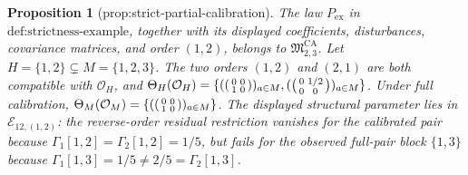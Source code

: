 \documentclass{article}
\newtheorem{proposition}{Proposition}
\begin{document}
\begin{proposition}[prop:strict-partial-calibration]\label{prop:strict-partial-calibration}
The law \(P_{\mathrm{ex}}\) in \(\text{def:strictness-example}\), together with its displayed coefficients, disturbances, covariance matrices, and order \((1,2)\), belongs to \(\mathfrak M_{2,3}^{\mathrm{CA}}\). Let \(H=\{1,2\}\subsetneq M=\{1,2,3\}\). The two orders \((1,2)\) and \((2,1)\) are both compatible with \(\mathcal O_H\), and \(\Theta_H(\mathcal O_H)=\{(\begin{psmallmatrix}0&0\\1&0\end{psmallmatrix})_{a\in M},(\begin{psmallmatrix}0&1/2\\0&0\end{psmallmatrix})_{a\in M}\}\). Under full calibration, \(\Theta_M(\mathcal O_M)=\{(\begin{psmallmatrix}0&0\\1&0\end{psmallmatrix})_{a\in M}\}\). The displayed structural parameter lies in \(\mathcal E_{12,(1,2)}\): the reverse-order residual restriction vanishes for the calibrated pair because \(\Gamma_1[1,2]=\Gamma_2[1,2]=1/5\), but fails for the observed full-pair block \(\{1,3\}\) because \(\Gamma_1[1,3]=1/5\ne2/5=\Gamma_2[1,3]\).
\end{proposition}
\end{document}
